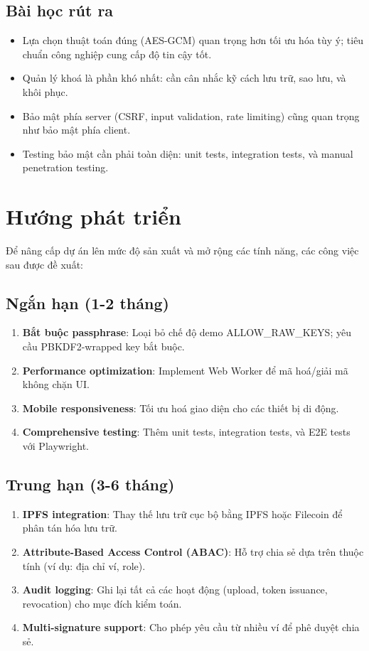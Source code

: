 \subsection*{Bài học rút ra}
\begin{itemize}
  \item Lựa chọn thuật toán đúng (AES-GCM) quan trọng hơn tối ưu hóa tùy ý; tiêu chuẩn công nghiệp cung cấp độ tin cậy tốt.
  \item Quản lý khoá là phần khó nhất: cần cân nhắc kỹ cách lưu trữ, sao lưu, và khôi phục.
  \item Bảo mật phía server (CSRF, input validation, rate limiting) cũng quan trọng như bảo mật phía client.
  \item Testing bảo mật cần phải toàn diện: unit tests, integration tests, và manual penetration testing.
\end{itemize}

\section{Hướng phát triển}
Để nâng cấp dự án lên mức độ sản xuất và mở rộng các tính năng, các công việc sau được đề xuất:

\subsection*{Ngắn hạn (1-2 tháng)}
\begin{enumerate}
  \item \textbf{Bắt buộc passphrase}: Loại bỏ chế độ demo ALLOW\_RAW\_KEYS; yêu cầu PBKDF2-wrapped key bắt buộc.
  \item \textbf{Performance optimization}: Implement Web Worker để mã hoá/giải mã không chặn UI.
  \item \textbf{Mobile responsiveness}: Tối ưu hoá giao diện cho các thiết bị di động.
  \item \textbf{Comprehensive testing}: Thêm unit tests, integration tests, và E2E tests với Playwright.
\end{enumerate}

\subsection*{Trung hạn (3-6 tháng)}
\begin{enumerate}
  \item \textbf{IPFS integration}: Thay thế lưu trữ cục bộ bằng IPFS hoặc Filecoin để phân tán hóa lưu trữ.
  \item \textbf{Attribute-Based Access Control (ABAC)}: Hỗ trợ chia sẻ dựa trên thuộc tính (ví dụ: địa chỉ ví, role).
  \item \textbf{Audit logging}: Ghi lại tất cả các hoạt động (upload, token issuance, revocation) cho mục đích kiểm toán.
  \item \textbf{Multi-signature support}: Cho phép yêu cầu từ nhiều ví để phê duyệt chia sẻ.
\end{enumerate}

